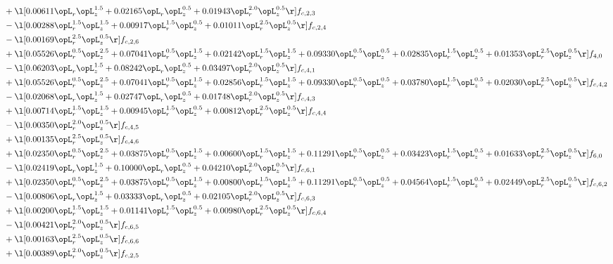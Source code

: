 \begin{alignat}{2}
& + \l[  0.00611 \opL_r \opL_z^{1.5} +  0.02165 \opL_r \opL_z^{0.5} +  0.01943 \opL_r^{2.0} \opL_z^{0.5}  \r] f_{c,2,3} \nonumber \\ 
& - \l[  0.00288 \opL_r^{1.5} \opL_z^{1.5} +  0.00917 \opL_r^{1.5} \opL_z^{0.5} +  0.01011 \opL_r^{2.5} \opL_z^{0.5}  \r] f_{c,2,4} \nonumber \\ 
& - \l[  0.00169 \opL_r^{2.5} \opL_z^{0.5}  \r] f_{c,2,6} \nonumber \\ 
& + \l[  0.05526 \opL_r^{0.5} \opL_z^{2.5} +  0.07041 \opL_r^{0.5} \opL_z^{1.5} +  0.02142 \opL_r^{1.5} \opL_z^{1.5} +  0.09330 \opL_r^{0.5} \opL_z^{0.5} +  0.02835 \opL_r^{1.5} \opL_z^{0.5} +  0.01353 \opL_r^{2.5} \opL_z^{0.5}  \r] f_{4,0} \nonumber \\ 
& - \l[  0.06203 \opL_r \opL_z^{1.5} +  0.08242 \opL_r \opL_z^{0.5} +  0.03497 \opL_r^{2.0} \opL_z^{0.5}  \r] f_{c,4,1} \nonumber \\ 
& + \l[  0.05526 \opL_r^{0.5} \opL_z^{2.5} +  0.07041 \opL_r^{0.5} \opL_z^{1.5} +  0.02856 \opL_r^{1.5} \opL_z^{1.5} +  0.09330 \opL_r^{0.5} \opL_z^{0.5} +  0.03780 \opL_r^{1.5} \opL_z^{0.5} +  0.02030 \opL_r^{2.5} \opL_z^{0.5}  \r] f_{c,4,2} \nonumber \\ 
& - \l[  0.02068 \opL_r \opL_z^{1.5} +  0.02747 \opL_r \opL_z^{0.5} +  0.01748 \opL_r^{2.0} \opL_z^{0.5}  \r] f_{c,4,3} \nonumber \\ 
& + \l[  0.00714 \opL_r^{1.5} \opL_z^{1.5} +  0.00945 \opL_r^{1.5} \opL_z^{0.5} +  0.00812 \opL_r^{2.5} \opL_z^{0.5}  \r] f_{c,4,4} \nonumber \\ 
& - \l[  0.00350 \opL_r^{2.0} \opL_z^{0.5}  \r] f_{c,4,5} \nonumber \\ 
& + \l[  0.00135 \opL_r^{2.5} \opL_z^{0.5}  \r] f_{c,4,6} \nonumber \\ 
& + \l[  0.02350 \opL_r^{0.5} \opL_z^{2.5} +  0.03875 \opL_r^{0.5} \opL_z^{1.5} +  0.00600 \opL_r^{1.5} \opL_z^{1.5} +  0.11291 \opL_r^{0.5} \opL_z^{0.5} +  0.03423 \opL_r^{1.5} \opL_z^{0.5} +  0.01633 \opL_r^{2.5} \opL_z^{0.5}  \r] f_{6,0} \nonumber \\ 
& - \l[  0.02419 \opL_r \opL_z^{1.5} +  0.10000 \opL_r \opL_z^{0.5} +  0.04210 \opL_r^{2.0} \opL_z^{0.5}  \r] f_{c,6,1} \nonumber \\ 
& + \l[  0.02350 \opL_r^{0.5} \opL_z^{2.5} +  0.03875 \opL_r^{0.5} \opL_z^{1.5} +  0.00800 \opL_r^{1.5} \opL_z^{1.5} +  0.11291 \opL_r^{0.5} \opL_z^{0.5} +  0.04564 \opL_r^{1.5} \opL_z^{0.5} +  0.02449 \opL_r^{2.5} \opL_z^{0.5}  \r] f_{c,6,2} \nonumber \\ 
& - \l[  0.00806 \opL_r \opL_z^{1.5} +  0.03333 \opL_r \opL_z^{0.5} +  0.02105 \opL_r^{2.0} \opL_z^{0.5}  \r] f_{c,6,3} \nonumber \\ 
& + \l[  0.00200 \opL_r^{1.5} \opL_z^{1.5} +  0.01141 \opL_r^{1.5} \opL_z^{0.5} +  0.00980 \opL_r^{2.5} \opL_z^{0.5}  \r] f_{c,6,4} \nonumber \\ 
& - \l[  0.00421 \opL_r^{2.0} \opL_z^{0.5}  \r] f_{c,6,5} \nonumber \\ 
& + \l[  0.00163 \opL_r^{2.5} \opL_z^{0.5}  \r] f_{c,6,6} \nonumber \\ 
& + \l[  0.00389 \opL_r^{2.0} \opL_z^{0.5}  \r] f_{c,2,5} \nonumber \\ 
\end{alignat} 


